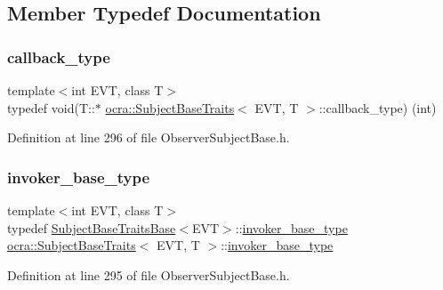 \subsection{Member Typedef Documentation}
\hypertarget{structocra_1_1SubjectBaseTraits_ab8c572ba6805d72ddf4137da6e2f4480}{}\label{structocra_1_1SubjectBaseTraits_ab8c572ba6805d72ddf4137da6e2f4480} 
\subsubsection{\texorpdfstring{callback\+\_\+type}{callback\_type}}
{\footnotesize\ttfamily template$<$int E\+VT, class T$>$ \\
typedef void(T\+::$\ast$ \hyperlink{structocra_1_1SubjectBaseTraits}{ocra\+::\+Subject\+Base\+Traits}$<$ E\+VT, T $>$\+::callback\+\_\+type) (int)}



Definition at line 296 of file Observer\+Subject\+Base.\+h.

\hypertarget{structocra_1_1SubjectBaseTraits_a067ad14df588b765cd8941e21348c954}{}\label{structocra_1_1SubjectBaseTraits_a067ad14df588b765cd8941e21348c954} 
\subsubsection{\texorpdfstring{invoker\+\_\+base\+\_\+type}{invoker\_base\_type}}
{\footnotesize\ttfamily template$<$int E\+VT, class T$>$ \\
typedef \hyperlink{structocra_1_1SubjectBaseTraitsBase}{Subject\+Base\+Traits\+Base}$<$E\+VT$>$\+::\hyperlink{structocra_1_1SubjectBaseTraitsBase_a439671662c8f8f3e80e6675f008dec3f}{invoker\+\_\+base\+\_\+type} \hyperlink{structocra_1_1SubjectBaseTraits}{ocra\+::\+Subject\+Base\+Traits}$<$ E\+VT, T $>$\+::\hyperlink{structocra_1_1SubjectBaseTraitsBase_a439671662c8f8f3e80e6675f008dec3f}{invoker\+\_\+base\+\_\+type}}



Definition at line 295 of file Observer\+Subject\+Base.\+h.

